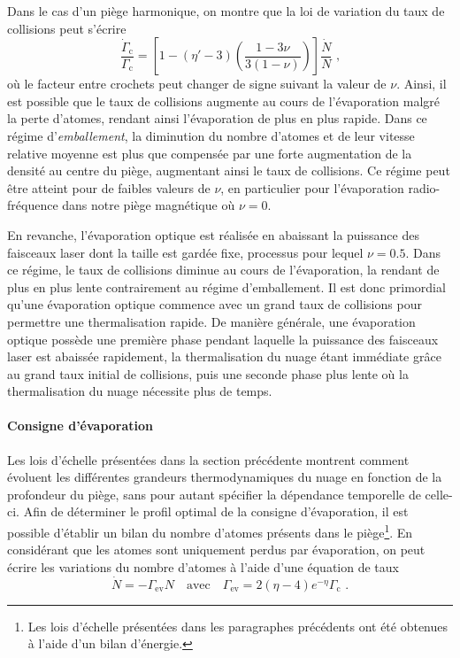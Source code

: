 Dans le cas d'un piège harmonique, on montre que la loi de variation du taux de collisions peut s'écrire \citep{o2001scaling}
\begin{equation}
\frac{\dot{\Gamma}_{\mathrm{c}}}{\Gamma_{\mathrm{c}}}=\left[ 1- (\eta'-3) \left( \frac{1-3\nu}{3(1-\nu)}\right)\right] \frac{\dot{N}}{N} \text{ ,}
\end{equation}
où le facteur entre crochets peut changer de signe suivant la valeur de $\nu$. Ainsi, il est possible que le taux de collisions augmente au cours de l'évaporation malgré la perte d'atomes, rendant ainsi l'évaporation de plus en plus rapide. Dans ce régime d'\emph{emballement}, la diminution du nombre d'atomes et de leur vitesse relative moyenne est plus que compensée par une forte augmentation de la densité au centre du piège, augmentant ainsi le taux de collisions. Ce régime peut être atteint pour de faibles valeurs de $\nu$, en particulier pour l'évaporation radio-fréquence dans notre piège magnétique où $\nu=0$. 

En revanche, l'évaporation optique est réalisée en abaissant la puissance des faisceaux laser dont la taille est gardée fixe, processus pour lequel $\nu=0.5$. Dans ce régime, le taux de collisions diminue au cours de l'évaporation, la rendant de plus en plus lente contrairement au régime d'emballement. Il est donc primordial qu'une évaporation optique commence avec un grand taux de collisions pour permettre une thermalisation rapide. De manière générale, une évaporation optique possède une première phase pendant laquelle la puissance des faisceaux laser est abaissée rapidement, la thermalisation du nuage étant immédiate grâce au grand taux initial de collisions, puis une seconde phase plus lente où la thermalisation du nuage nécessite plus de temps. 


\paragraph*{Consigne d'évaporation}
Les lois d'échelle présentées dans la section précédente montrent comment évoluent les différentes grandeurs thermodynamiques du nuage en fonction de la profondeur du piège, sans pour autant spécifier la dépendance temporelle de celle-ci. Afin de déterminer le profil optimal de la consigne d'évaporation, il est possible d'établir un bilan du nombre d'atomes présents dans le piège\footnote{Les lois d'échelle présentées dans les paragraphes précédents ont été obtenues à l'aide d'un bilan d'énergie.}.
En considérant que les atomes sont uniquement perdus par évaporation, on peut écrire les variations du nombre d'atomes à l'aide d'une équation de taux \citep{luiten1996kinetic}\citep{o2001scaling}
\begin{equation}
\dot{N} = - \Gamma_{\mathrm{ev}} N \quad \text{avec} \quad \Gamma_{\mathrm{ev}}=2(\eta-4) e^{-\eta} \Gamma_{\mathrm{c}} \text{ .}
\label{eq:pertes_evap_naturelle}
\end{equation}

